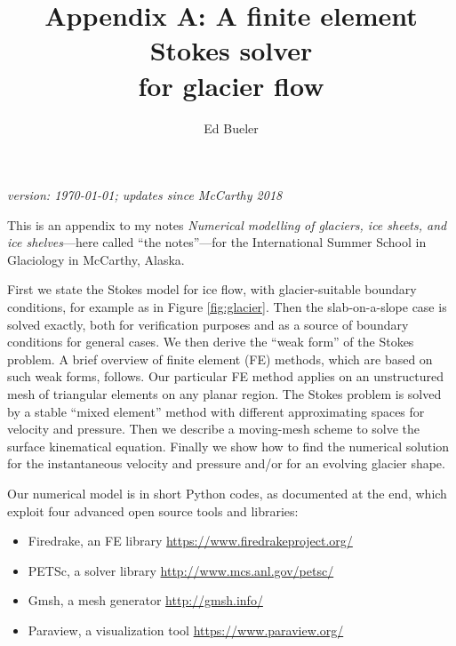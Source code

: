 \documentclass[letterpaper,final,12pt,reqno]{amsart}
\begin{document}
\graphicspath{{figures/}}

\title[Appendix A]{Appendix A: A finite element Stokes solver \\ for glacier flow}

\author{Ed Bueler}

\maketitle

\vspace{-8mm}
\begin{center}
\footnotesize
\emph{version: \today; updates since McCarthy 2018}
\end{center}

\thispagestyle{empty}
\bigskip

\renewcommand{\thefigure}{A\arabic{figure}}
\renewcommand{\theequation}{A\arabic{equation}}
\renewcommand{\thesection}{A.\arabic{section}}

This is an appendix to my notes \emph{Numerical modelling of glaciers, ice sheets, and ice shelves}---here called ``the notes''---for the International Summer School in Glaciology in McCarthy, Alaska.

First we state the Stokes model for ice flow, with glacier-suitable boundary conditions, for example as in Figure \ref{fig:glacier}.  Then the slab-on-a-slope case is solved exactly, both for verification purposes and as a source of boundary conditions for general cases.  We then derive the ``weak form'' of the Stokes problem.  A brief overview of finite element (FE) methods, which are based on such weak forms, follows.  Our particular FE method applies on an unstructured mesh of triangular elements on any planar region.  The Stokes problem is solved by a stable ``mixed element'' method with different approximating spaces for velocity and pressure.  Then we describe a moving-mesh scheme to solve the surface kinematical equation.  Finally we show how to find the numerical solution for the instantaneous velocity and pressure and/or for an evolving glacier shape.

Our numerical model is in short Python codes, as documented at the end, which exploit four advanced open source tools and libraries:
\begin{itemize}
\item Firedrake, an FE library \hfill \url{https://www.firedrakeproject.org/}
\item PETSc, a solver library \hfill \url{http://www.mcs.anl.gov/petsc/}
\item Gmsh, a mesh generator \hfill \url{http://gmsh.info/}
\item Paraview, a visualization tool \hfill \url{https://www.paraview.org/}
\end{itemize}
\end{document}
